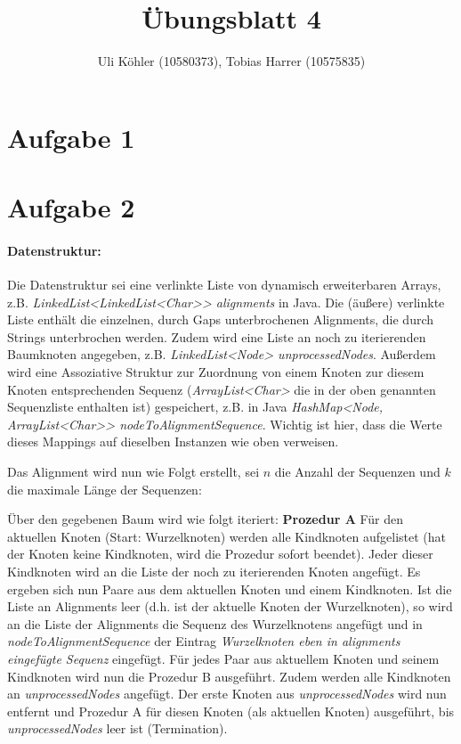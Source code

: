 \documentclass[a4paper,10pt,oneside,reqno]{scrartcl}
\title{Übungsblatt 4}
\author{Uli Köhler (10580373), Tobias Harrer (10575835)}
\begin{document}
\maketitle
\section*{Aufgabe 1}%

\section*{Aufgabe 2}%
\paragraph{Datenstruktur:}
Die Datenstruktur sei eine verlinkte Liste von dynamisch erweiterbaren Arrays, z.B. \textit{LinkedList<LinkedList<Char>> alignments} in Java.
Die (äußere) verlinkte Liste enthält die einzelnen, durch Gaps unterbrochenen Alignments, die durch Strings unterbrochen werden. Zudem wird eine Liste an noch zu iterierenden Baumknoten angegeben, z.B. \textit{LinkedList<Node> unprocessedNodes}. Außerdem wird eine Assoziative Struktur zur Zuordnung von einem Knoten zur diesem Knoten entsprechenden Sequenz (\textit{ArrayList<Char>} die in der oben genannten Sequenzliste enthalten ist) gespeichert, z.B. in Java \textit{HashMap<Node, ArrayList<Char>> nodeToAlignmentSequence}. Wichtig ist hier, dass die Werte dieses Mappings auf dieselben Instanzen wie oben verweisen.

Das Alignment wird nun wie Folgt erstellt, sei $n$ die Anzahl der Sequenzen und $k$ die maximale Länge der Sequenzen: 

Über den gegebenen Baum wird wie folgt iteriert:
\textbf{Prozedur A} Für den aktuellen Knoten (Start: Wurzelknoten) werden alle Kindknoten aufgelistet (hat der Knoten keine Kindknoten, wird die Prozedur sofort beendet). Jeder dieser Kindknoten wird an die Liste der noch zu iterierenden Knoten angefügt. Es ergeben sich nun Paare aus dem aktuellen Knoten und einem Kindknoten. Ist die Liste an Alignments leer (d.h. ist der aktuelle Knoten der Wurzelknoten), so wird an die Liste der Alignments die Sequenz des Wurzelknotens angefügt und in \textit{nodeToAlignmentSequence} der Eintrag \textit{Wurzelknoten \textrightarrow eben in alignments eingefügte Sequenz} eingefügt. Für jedes Paar aus aktuellem Knoten und seinem Kindknoten wird nun die Prozedur B ausgeführt. Zudem werden alle Kindknoten an \textit{unprocessedNodes} angefügt. Der erste Knoten aus \textit{unprocessedNodes} wird nun entfernt und Prozedur A für diesen Knoten (als aktuellen Knoten) ausgeführt, bis \textit{unprocessedNodes} leer ist (\textrightarrow Termination).\\[5mm]
\end{document}
